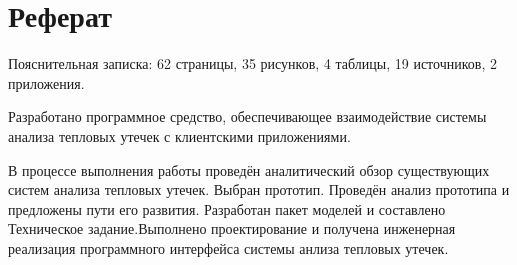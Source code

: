 {
	\titleformat{\section}[block]{\centering\normalfont\large\bfseries}{\thesection}{10pt}{}
	\section*{\centering Реферат}

	\par

		Пояснительная записка: 62 страницы, 35 рисунков, 4 таблицы, 19 источников, 2 приложения.

		Разработано программное средство, обеспечивающее взаимодействие системы анализа тепловых утечек с клиентскими приложениями.

		В процессе выполнения работы проведён аналитический обзор существующих систем анализа тепловых утечек. Выбран прототип. Проведён анализ прототипа и предложены пути его развития. Разработан пакет моделей и составлено Техническое задание.Выполнено проектирование и получена инженерная реализация программного интерфейса системы анлиза тепловых утечек.
}

\pagebreak